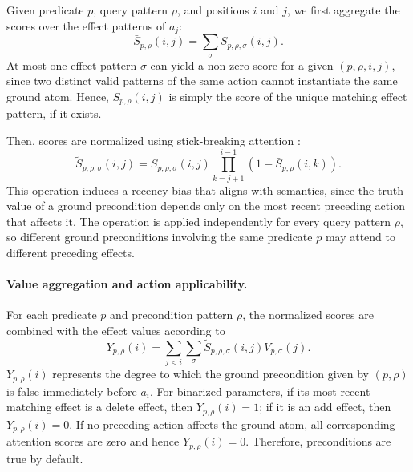 Given predicate $p$, query pattern $\rho$, and positions $i$ and $j$, we
first aggregate the scores over the effect patterns of $a_j$:
\begin{equation}
\bar{S}_{p,\rho}(i,j)
=
\sum_{\sigma}
S_{p,\rho,\sigma}(i,j).
\label{eq:strips-aggregated-score}
\end{equation}
At most one effect pattern $\sigma$ can yield a non-zero score for a given
$(p,\rho,i,j)$, since two distinct valid patterns of the same action cannot
instantiate the same ground atom.
Hence, $\bar{S}_{p,\rho}(i,j)$ is simply the score of the unique matching
effect pattern, if it exists.

Then, scores are normalized using stick-breaking attention \citep{tan2025scaling}:
\begin{equation}
\widetilde{S}_{p,\rho,\sigma}(i,j)
=
S_{p,\rho,\sigma}(i,j)
\prod_{k=j+1}^{i-1}
\left(
1-\bar{S}_{p,\rho}(i,k)
\right).
\label{eq:strips-stick-breaking}
\end{equation}
This operation induces a recency bias that aligns with \strips semantics,
since the truth value of a ground precondition depends only on the most recent
preceding action that affects it.
The operation is applied independently for every query pattern $\rho$, so
different ground preconditions involving the same predicate $p$ may attend to
different preceding effects.


\paragraph{Value aggregation and action applicability.}
For each predicate $p$ and precondition pattern $\rho$, the normalized scores are combined with the effect values according to
\begin{equation}
Y_{p,\rho}(i)
=
\sum_{j<i}
\sum_{\sigma}
\widetilde{S}_{p,\rho,\sigma}(i,j)
V_{p,\sigma}(j).
\label{eq:strips-value-aggregation}
\end{equation}
$Y_{p,\rho}(i)$ represents the degree to which the ground precondition given by $(p,\rho)$ is false immediately before $a_i$.
For binarized parameters, if its most recent matching effect is a delete effect, then $Y_{p,\rho}(i)=1$; if it is an add effect, then $Y_{p,\rho}(i)=0$.
If no preceding action affects the ground atom, all corresponding attention scores are zero and hence $Y_{p,\rho}(i)=0$.
Therefore, preconditions are true by default.

